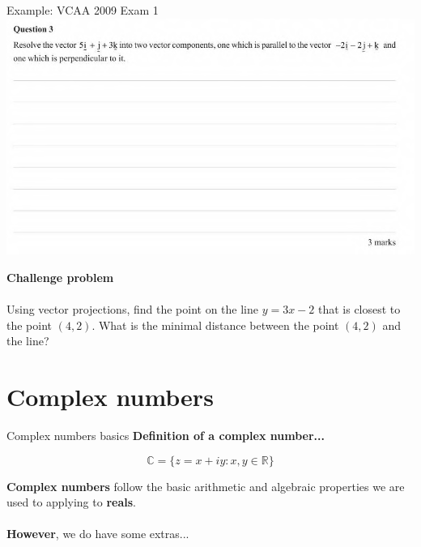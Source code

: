 \documentclass{beamer}
\begin{document}
\begin{frame}
	Example: VCAA 2009 Exam 1
	\includegraphics[width = \linewidth]{img/q2.png}
\end{frame}

\begin{frame}

	\textbf{Challenge problem}
	\\~\\
	Using vector projections, find the point on the line $y = 3x - 2$ that is closest to the point $(4, 2)$. 
	What is the minimal distance between the point $(4, 2)$ and the line?	
	
	\vspace{5cm}
	

\end{frame}

\section{Complex numbers}

\begin{frame}{Complex numbers basics}
	\textbf{Definition of a complex number...}
	
	$$\mathbb{C} = \{z = x + iy : x, y \in \mathbb{R} \}$$
	
	
	\textbf{Complex numbers} follow the basic arithmetic and algebraic properties we are used to applying to \textbf{reals}.
	\\~\\
	\textbf{However}, we do have some extras...

\end{frame}
\end{document}
